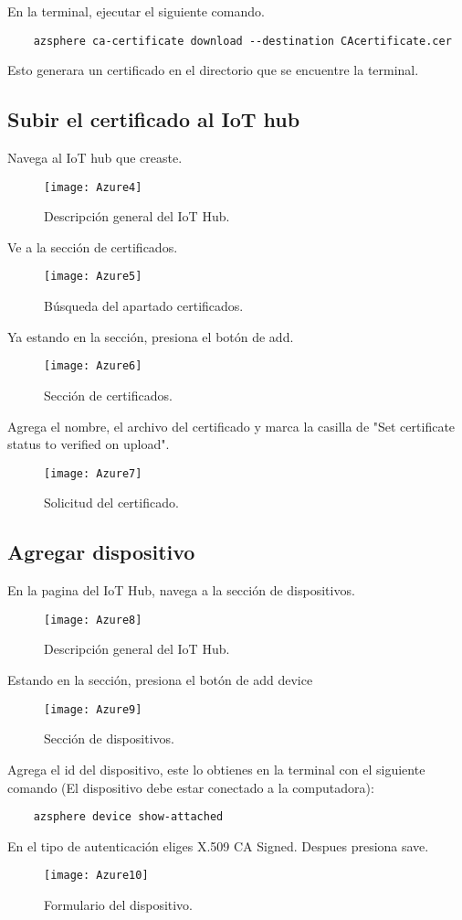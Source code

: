 En la terminal, ejecutar el siguiente comando.
\begin{verbatim}
	azsphere ca-certificate download --destination CAcertificate.cer
\end{verbatim}
Esto generara un certificado en el directorio que se encuentre la terminal.
\pagebreak
\subsection{Subir el certificado al IoT hub}
Navega al IoT hub que creaste.
\begin{figure}[h]
	\centering
	\texttt{[image: Azure4]}
	\caption{Descripción general del IoT Hub.}
\end{figure}

Ve a la sección de certificados.
\begin{figure}[h]
	\centering
	\texttt{[image: Azure5]}
	\caption{Búsqueda del apartado certificados.}
\end{figure}

\pagebreak
Ya estando en la sección, presiona el botón de add.
\begin{figure}[h]
	\centering
	\texttt{[image: Azure6]}
	\caption{Sección de certificados.}
\end{figure}

Agrega el nombre, el archivo del certificado y marca la casilla de "Set certificate status to verified on upload".
\begin{figure}[h]
	\centering
	\texttt{[image: Azure7]}
	\caption{Solicitud del certificado.}
\end{figure}
\pagebreak
\subsection{Agregar dispositivo}
En la pagina del IoT Hub, navega a la sección de dispositivos.
\begin{figure}[h]
	\centering
	\texttt{[image: Azure8]}
	\caption{Descripción general del IoT Hub.}
\end{figure}

Estando en la sección, presiona el botón de add device
\begin{figure}[h]
	\centering
	\texttt{[image: Azure9]}
	\caption{Sección de dispositivos.}
\end{figure}

\pagebreak
Agrega el id del dispositivo, este lo obtienes en la terminal con el siguiente comando (El dispositivo debe estar conectado a la computadora):
\begin{verbatim}
	azsphere device show-attached
\end{verbatim}
En el tipo de autenticación eliges X.509 CA Signed. Despues presiona save.
\begin{figure}[h]
	\centering
	\texttt{[image: Azure10]}
	\caption{Formulario del dispositivo.}
\end{figure}
